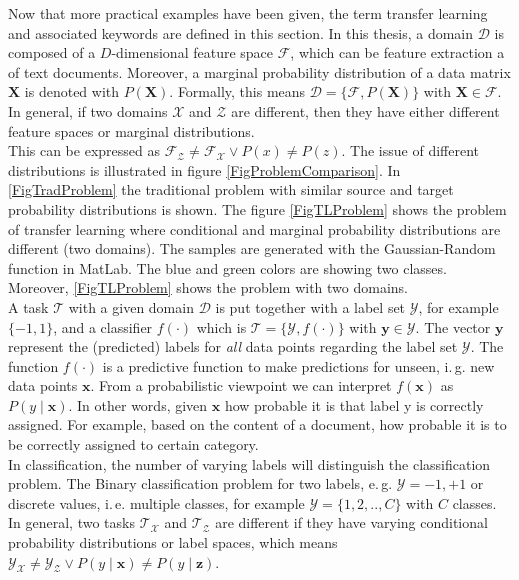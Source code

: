 Now that more practical examples have been given, the term transfer learning and associated keywords are defined in this section.\newline
In this thesis, a domain $\mathcal{D}$ is composed of a $D$-dimensional feature space $\mathcal{F}$, which can be feature extraction a of text documents. Moreover, a marginal probability distribution of a data matrix $\mathbf{X}$ is denoted with  $P(\mathbf{X})$.
Formally, this means $\mathcal{D} = \{\mathcal{F},P(\mathbf{X})\}$ with $\mathbf{X} \in \mathcal{F}$.
In general, if two domains $\mathcal{X}$ and $\mathcal{Z}$ are different, then they have either different feature spaces or marginal distributions.\\
This can be expressed as $\mathcal{F_{Z}} \neq \mathcal{F_{X}} \vee P(x) \neq \textit{P}(z)$.\cite[p. 542]{Aggarwal.2015}
The issue of different distributions is illustrated in figure \ref{FigProblemComparison}.
In \ref{FigTradProblem} the traditional problem with similar source and target probability distributions is shown.
The figure \ref{FigTLProblem} shows the problem of transfer learning where conditional and marginal probability distributions are different (two domains).
The samples are generated with the Gaussian-Random function in MatLab.
The blue and green colors are showing two classes.
Moreover, \ref{FigTLProblem} shows the problem with two domains.\\
A task $\mathcal{T}$ with a given domain $\mathcal{D}$ is put together with a label set $\mathcal{Y}$, for example $\{-1,1\}$, and a classifier $f(\cdot)$ which is  $\mathcal{T} = \{\mathcal{Y},\textit{f}(\cdot)\}$ with $\mathbf{y} \in \mathcal{Y}$.
The vector $\mathbf{y}$ represent the (predicted) labels for \textit{all} data points regarding the label set $\mathcal{Y}$.
The function $f(\cdot)$ is a predictive function to make predictions for unseen, i.\,g. new data points $\mathbf{x}$.
From a probabilistic viewpoint we can interpret $f(\mathbf{x})$ as $P(y\mid \mathbf{x})$.
In other words, given $\mathbf{x}$ how probable it is that label y is correctly assigned.
For example, based on the content of a document, how probable it is to be correctly assigned to certain category.\cite[p. 542]{Aggarwal.2015}\\
In classification, the number of varying labels will distinguish the classification problem.
The Binary classification problem for two labels, e.\,g. $\mathcal{Y} ={-1,+1}$ or discrete values, i.\,e. multiple classes, for example $\mathcal{Y}= \{1,2,..,C\}$ with $C$ classes.
In general, two tasks $\mathcal{T_X}$ and $\mathcal{T_{Z}}$ are different if they have varying conditional probability distributions or label spaces, which means $\mathcal{Y_{X}} \neq \mathcal{Y_{Z}} \vee P(y\mid \mathbf{x}) \neq P(y\mid \mathbf{z})$.\cite[p. 542]{Aggarwal.2015}\\ 
